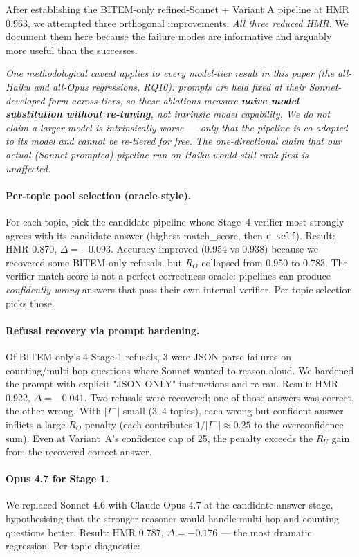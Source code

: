 \documentclass[11pt,a4paper]{article}
\newcommand{\HMR}{\textsc{HMR}}
\begin{document}
After establishing the BITEM-only refined-Sonnet + Variant A pipeline at
\HMR{} 0.963, we attempted three orthogonal improvements. \emph{All three
reduced \HMR}. We document them here because the failure modes are
informative and arguably more useful than the successes.

\emph{One methodological caveat applies to every model-tier result in this paper
(the all-Haiku and all-Opus regressions, RQ10): prompts are held fixed at their
Sonnet-developed form across tiers, so these ablations measure \textbf{naive model
substitution without re-tuning}, not intrinsic model capability. We do not claim a
larger model is intrinsically worse --- only that the pipeline is co-adapted to its
model and cannot be re-tiered for free. The one-directional claim that our actual
(Sonnet-prompted) pipeline run on Haiku would still rank first is unaffected.}

\paragraph{Per-topic pool selection (oracle-style).} For each topic,
pick the candidate pipeline whose Stage~4 verifier most strongly agrees
with its candidate answer (highest match\_score, then \texttt{c\_self}).
Result: \HMR{} 0.870, $\Delta = -0.093$. Accuracy improved (0.954 vs 0.938)
because we recovered some BITEM-only refusals, but $R_O$ collapsed from
0.950 to 0.783. The verifier match-score is not a perfect correctness
oracle: pipelines can produce \emph{confidently wrong} answers that pass
their own internal verifier. Per-topic selection picks those.

\paragraph{Refusal recovery via prompt hardening.} Of BITEM-only's 4 Stage-1
refusals, 3 were JSON parse failures on counting/multi-hop questions where
Sonnet wanted to reason aloud. We hardened the prompt with explicit "JSON
ONLY" instructions and re-ran. Result: \HMR{} 0.922, $\Delta = -0.041$.
Two refusals were recovered; one of those answers was correct, the other
wrong. With $|I^-|$ small (3–4 topics), each wrong-but-confident answer
inflicts a large $R_O$ penalty (each contributes $1/|I^-| \approx 0.25$
to the overconfidence sum). Even at Variant~A's confidence cap of 25, the
penalty exceeds the $R_U$ gain from the recovered correct answer.

\paragraph{Opus 4.7 for Stage 1.} We replaced Sonnet 4.6 with Claude Opus
4.7 at the candidate-answer stage, hypothesising that the stronger reasoner
would handle multi-hop and counting questions better. Result: \HMR{} 0.787,
$\Delta = -0.176$ — the most dramatic regression. Per-topic diagnostic:
\end{document}
